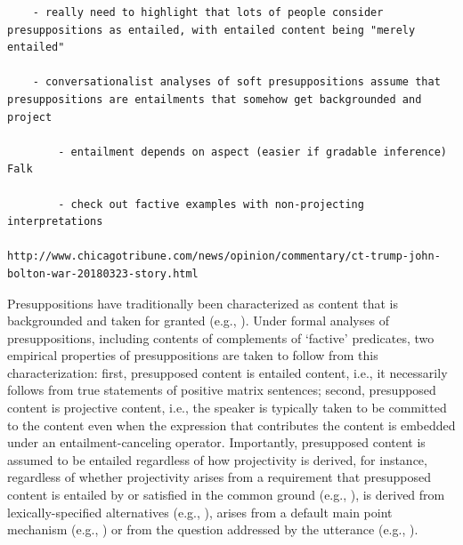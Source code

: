 \documentclass[11pt,fleqn]{article}
\newcommand{\6}{\mbox{$[\hspace*{-.6mm}[$}}
\newcommand{\9}{\mbox{$]\hspace*{-.6mm}]$}}
\begin{document}
{\begin{verbatim}
	- really need to highlight that lots of people consider presuppositions as entailed, with entailed content being "merely entailed"
	
	- conversationalist analyses of soft presuppositions assume that presuppositions are entailments that somehow get backgrounded and project 

		- entailment depends on aspect (easier if gradable inference) Falk
		
		- check out factive examples with non-projecting interpretations
		
http://www.chicagotribune.com/news/opinion/commentary/ct-trump-john-bolton-war-20180323-story.html

\end{verbatim}

Presuppositions have traditionally been characterized as content that is backgrounded and taken for granted (e.g., \citealt{stalnaker74,ccmg90}). Under formal analyses of presuppositions, including contents of complements of `factive' predicates, two empirical properties of presuppositions are taken to follow from this characterization: first, presupposed content is entailed content, i.e., it necessarily follows from true statements of positive matrix sentences; second, presupposed content is projective content, i.e., the speaker is typically taken to be committed to the content even when the expression that contributes the content is embedded under an entailment-canceling operator. Importantly, presupposed content is assumed to be entailed regardless of how projectivity is derived, for instance, regardless of whether projectivity arises from a requirement that presupposed content is entailed by or satisfied in the common ground (e.g., \citealt{heim83,vds92}),  is derived  from lexically-specified alternatives (e.g., \citealt{abusch10,romoli2015}), arises from a default main point mechanism (e.g., \citealt{abrusan2011,abrusan2016}) or from the question addressed by the utterance (e.g., \citealt{best-question}). 

}
\end{document}
